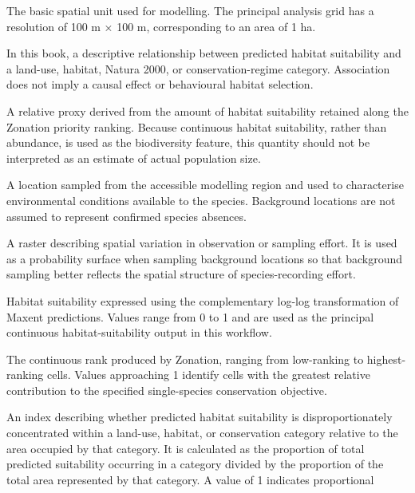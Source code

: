 \documentclass[
  openany]{book}
\providecommand{\tightlist}{%
  \setlength{\itemsep}{0pt}\setlength{\parskip}{0pt}}
\providecommand{\tightlist}{%
  \setlength{\itemsep}{0pt}%
  \setlength{\parskip}{0pt}%
}
\begin{document}
\begin{description}
\tightlist
\item[\textbf{Analysis cell}]
The basic spatial unit used for modelling. The principal analysis grid has a
resolution of 100 m × 100 m, corresponding to an area of 1 ha.
\item[\textbf{Association}]
In this book, a descriptive relationship between predicted habitat suitability
and a land-use, habitat, Natura 2000, or conservation-regime category. Association
does not imply a causal effect or behavioural habitat selection.
\item[\textbf{Apparent population}]
A relative proxy derived from the amount of habitat suitability retained along
the Zonation priority ranking. Because continuous habitat suitability, rather than
abundance, is used as the biodiversity feature, this quantity should not be
interpreted as an estimate of actual population size.
\item[\textbf{Background location}]
A location sampled from the accessible modelling region and used to characterise
environmental conditions available to the species. Background locations are not
assumed to represent confirmed species absences.
\item[\textbf{Bias layer / effort-bias layer}]
A raster describing spatial variation in observation or sampling effort. It is
used as a probability surface when sampling background locations so that background
sampling better reflects the spatial structure of species-recording effort.
\item[\textbf{Cloglog suitability}]
Habitat suitability expressed using the complementary log-log transformation
of Maxent predictions. Values range from 0 to 1 and are used as the principal
continuous habitat-suitability output in this workflow.
\item[\textbf{Conservation-priority rank}]
The continuous rank produced by Zonation, ranging from low-ranking to
highest-ranking cells. Values approaching 1 identify cells with the greatest
relative contribution to the specified single-species conservation objective.
\item[\textbf{Continuous relative suitability index}]
An index describing whether predicted habitat suitability is disproportionately
concentrated within a land-use, habitat, or conservation category relative to
the area occupied by that category. It is calculated as the proportion of total
predicted suitability occurring in a category divided by the proportion of
the total area represented by that category. A value of 1 indicates proportional

\end{description}
\end{document}
